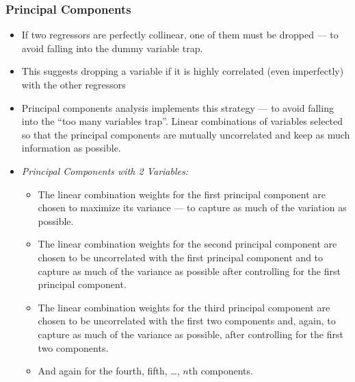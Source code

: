 

\begin{frame}
\frametitle{Principal Components}
\begin{itemize}
\item If two regressors are perfectly collinear, one of them must be dropped --- to avoid falling into the dummy variable trap.
\item This suggests dropping a variable if it is highly correlated (even imperfectly) with the other regressors
\item Principal components analysis implements this strategy  --- to avoid falling into the ``too many variables trap''. Linear combinations of variables selected so that the principal components are mutually uncorrelated and keep as much information as possible. 
\item \emph{Principal Components with 2 Variables:}
\begin{itemize}
\item The linear combination weights for the first principal component are chosen to maximize its variance --- to capture as much of the variation as possible. 
\item The linear combination weights for the second principal component are chosen to be uncorrelated with the first principal component and to capture as much of the variance as possible after controlling for the first principal component. 
\item The linear combination weights for the third principal component are chosen to be uncorrelated with the first two components and, again, to capture as much of the variance as possible, after controlling for the first two components.
\item And again for the fourth, fifth, \ldots, $n$th components.
\end{itemize}
\end{itemize}
\end{frame}


